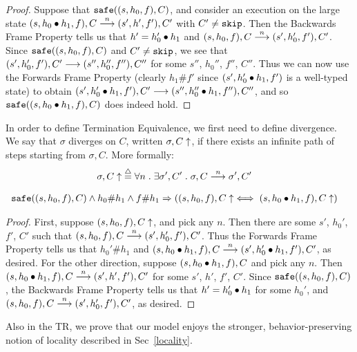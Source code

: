 \begin{proof}
Suppose that $\text{\tt{safe}}((s,h_0,f),C)$, and consider an execution on the large state 
$(s,h_0 \bullet h_1,f),C \stackrel{n}{\longrightarrow} (s',h',f'),C'$ with $C' \neq \text{\tt{skip}}$. Then the Backwards Frame Property tells us
that $h' = h_0' \bullet h_1$ and $(s,h_0,f),C \stackrel{n}{\longrightarrow} (s',h_0',f'),C'$. Since $\text{\tt{safe}}((s,h_0,f),C)$ and $C' \neq \text{\tt{skip}}$,
we see that $(s',h_0',f'),C' \longrightarrow (s'',h_0'',f''),C''$ for some $s''$, $h_0''$, $f''$, $C''$. Thus we can now use the 
Forwards Frame Property (clearly $h_1 \# f'$ since $(s',h_0' \bullet h_1,f')$ is a well-typed state) to obtain 
$(s',h_0' \bullet h_1,f'),C' \longrightarrow (s'',h_0'' \bullet h_1,f''),C''$, and so $\text{\tt{safe}}((s,h_0 \bullet h_1,f),C)$ does indeed hold.
\end{proof}

In order to define 
Termination Equivalence, we first need to define divergence. We say that $\sigma$ diverges on $C$,
written  $\sigma,C \uparrow$, if there exists an infinite path of steps starting from $\sigma,C$. More formally:
\begin{align*}
\sigma,C \uparrow & \stackrel{\triangle}{=} \forall n \hspace{1mm} . \hspace{1mm} \exists \sigma',C' \hspace{1mm} . \hspace{1mm} \sigma,C \stackrel{n}{\longrightarrow} \sigma',C'
\end{align*}

\begin{lem}
\begin{align*}
\text{\tt{safe}} & ((s,h_0,f),C) \land h_0 \# h_1 \land f \# h_1 \Rightarrow ((s,h_0,f),C \uparrow \iff (s,h_0 \bullet h_1,f),C \uparrow)
\end{align*}
\end{lem}

\begin{proof}
First, suppose $(s,h_0,f),C \uparrow$, and pick any $n$. Then there are some $s'$, $h_0'$, $f'$, $C'$ such
that $(s,h_0,f),C \stackrel{n}{\longrightarrow} (s',h_0',f'),C'$. Thus the Forwards Frame Property tells us that $h_0' \# h_1$ and
$(s,h_0 \bullet h_1,f),C \stackrel{n}{\longrightarrow} (s',h_0' \bullet h_1,f'),C'$, as desired. For the other direction, suppose
$(s,h_0 \bullet h_1,f),C$ and pick any $n$. Then  $(s,h_0 \bullet h_1,f),C \stackrel{n}{\longrightarrow} (s',h',f'),C'$ for some $s'$,
$h'$, $f'$, $C'$. Since $\text{\tt{safe}}((s,h_0,f),C)$, the Backwards Frame Property tells us 
that $h' = h_0' \bullet h_1$ for some $h_0'$, and $(s,h_0,f),C \stackrel{n}{\longrightarrow} (s',h_0',f'),C'$, as desired.
\end{proof}

\else
Also in the TR, we prove that 
our model enjoys the stronger, behavior-preserving notion of locality
described in Sec~\ref{locality}.
\fi

